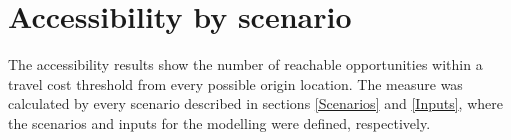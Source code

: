 \documentclass[12pt, a4paper]{report}
\begin{document}
\section{Accessibility by scenario}

The accessibility results show the number of reachable opportunities within a travel cost threshold from every possible origin location. The measure was calculated by every scenario described in sections \ref{Scenarios} and \ref{Inputs}, where the scenarios and inputs for the modelling were defined, respectively.

    
\end{document}
